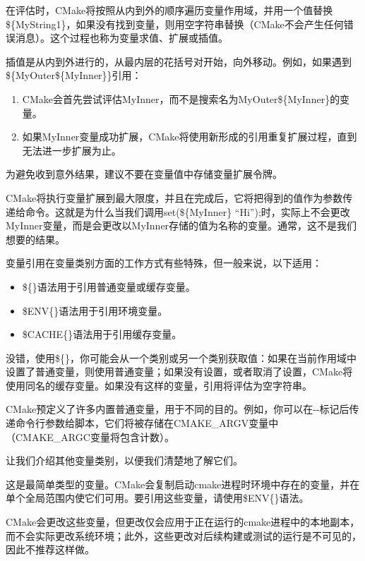 在评估时，CMake将按照从内到外的顺序遍历变量作用域，并用一个值替换\$\{MyString1\}，如果没有找到变量，则用空字符串替换（CMake不会产生任何错误消息）。这个过程也称为变量求值、扩展或插值。

插值是从内到外进行的，从最内层的花括号对开始，向外移动。例如，如果遇到\$\{MyOuter\$\{MyInner\}\}引用：

\begin{enumerate}
\item
CMake会首先尝试评估MyInner，而不是搜索名为MyOuter\$\{MyInner\}的变量。

\item
如果MyInner变量成功扩展，CMake将使用新形成的引用重复扩展过程，直到无法进一步扩展为止。
\end{enumerate}

为避免收到意外结果，建议不要在变量值中存储变量扩展令牌。

CMake将执行变量扩展到最大限度，并且在完成后，它将把得到的值作为参数传递给命令。这就是为什么当我们调用set(\$\{MyInner\} “Hi”);时，实际上不会更改MyInner变量，而是会更改以MyInner存储的值为名称的变量。通常，这不是我们想要的结果。

变量引用在变量类别方面的工作方式有些特殊，但一般来说，以下适用：

\begin{itemize}
\item
\$\{\}语法用于引用普通变量或缓存变量。

\item
\$ENV\{\}语法用于引用环境变量。

\item
\$CACHE\{\}语法用于引用缓存变量。
\end{itemize}

没错，使用\$\{\}，你可能会从一个类别或另一个类别获取值：如果在当前作用域中设置了普通变量，则使用普通变量；如果没有设置，或者取消了设置，CMake将使用同名的缓存变量。如果没有这样的变量，引用将评估为空字符串。

CMake预定义了许多内置普通变量，用于不同的目的。例如，你可以在-{}-标记后传递命令行参数给脚本，它们将被存储在CMAKE\_ARGV变量中（CMAKE\_ARGC变量将包含计数）。

让我们介绍其他变量类别，以便我们清楚地了解它们。


这是最简单类型的变量。CMake会复制启动cmake进程时环境中存在的变量，并在单个全局范围内使它们可用。要引用这些变量，请使用\$ENV\{\}语法。

CMake会更改这些变量，但更改仅会应用于正在运行的cmake进程中的本地副本，而不会实际更改系统环境；此外，这些更改对后续构建或测试的运行是不可见的，因此不推荐这样做。

